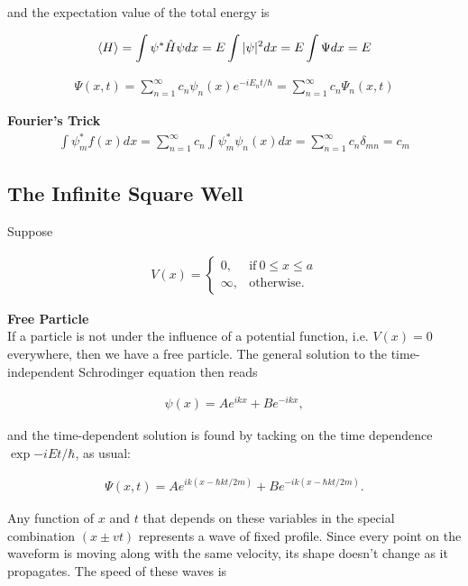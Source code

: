 \documentclass{article}
\begin{document}
and the expectation value of the total energy is

\begin{gather*}
    \braket{H} = \int \psi^* \hat{H} \psi dx = E \int |\psi|^2 dx = E\int \Psi dx = E
\end{gather*}

\begin{gather*}
    \Psi(x,t) = \sum_{n=1}^{\infty} c_{n} \psi_{n}(x) e^{-iE_{n}t/\hbar} = \sum_{n=1}^{\infty} c_{n} \Psi_{n}(x,t)
\end{gather*}

\noindent \textbf{Fourier's Trick} \\

\begin{gather*}
    \int \psi_{m}^{*} f(x) dx = \sum_{n=1}^{\infty} c_{n} \int \psi_{m}^{*} \psi_{n}(x) dx = \sum_{n=1}^{\infty} c_{n} \delta_{mn} = c_{m}
\end{gather*}

\subsection{The Infinite Square Well}
Suppose

\begin{gather*}
    V(x) = \begin{cases} 
                      0, & \text{if}\ 0 \leq x \leq a \\
                      \infty, & \text{otherwise}.
                   \end{cases}
\end{gather*}


\noindent \textbf{Free Particle} \\
\indent If a particle is not under the influence of a potential function, i.e. $V(x) = 0$ everywhere, then we have a free particle. The general solution to the time-independent Schrodinger equation then reads

\begin{gather*}
    \psi(x) = Ae^{ikx} + Be^{-ikx},
\end{gather*}

\noindent and the time-dependent solution is found by tacking on the time dependence $\exp{-iEt/\hbar}$, as usual:

\begin{gather*}
    \Psi(x,t) = Ae^{ik(x - \hbar k t / 2m)} + Be^{-ik(x - \hbar k t / 2m)}.
\end{gather*}

\indent Any function of $x$ and $t$ that depends on these variables in the special combination $(x \pm vt)$ represents a wave of fixed profile. Since every point on the waveform is moving along with the same velocity, its shape doesn't change as it propagates. The speed of these waves is 
\end{document}
